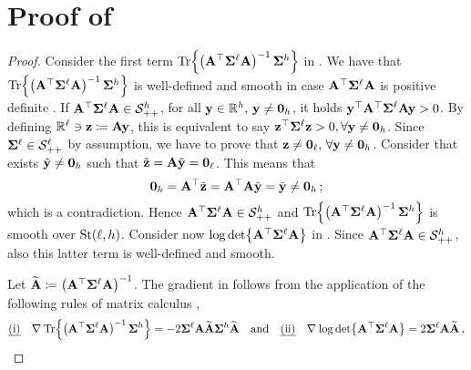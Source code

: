 \section{\texorpdfstring{Proof of }{Proof of Prop}}\label{app:proof}

\smoothnessth*
\begin{proof}
    Consider the first term $\Tr{\left(\A^\top \covlow \A \right)^{-1} \covhigh}$ in .
    We have that $\Tr{\left(\mathbf{A}^\top \covlow \mathbf{A} \right)^{-1} \covhigh}$ is well-defined and smooth in case $\mathbf{A}^\top \boldsymbol{\Sigma}^{\ell} \mathbf{A}$ is positive definite .
    If $\mathbf{A}^\top \boldsymbol{\Sigma}^{\ell} \mathbf{A} \in \mathcal{S}_{++}^h$, for all $\mathbf{y}\in \mathbb{R}^h, \, \mathbf{y}\neq \boldsymbol{0}_h$, it holds $\mathbf{y}^\top \mathbf{A}^\top \boldsymbol{\Sigma}^{\ell} \mathbf{A} \mathbf{y} > 0$.
    By defining $\mathbb{R}^\ell \ni \mathbf{z} \coloneqq \mathbf{A} \mathbf{y}$, this is equivalent to say $\mathbf{z}^\top \boldsymbol{\Sigma}^{\ell} \mathbf{z} > 0, \forall \mathbf{y} \neq \boldsymbol{0}_h$.
    Since $\boldsymbol{\Sigma}^{\ell} \in \mathcal{S}_{++}^{\ell}$ by assumption, we have to prove that $\mathbf{z} \neq \boldsymbol{0}_\ell, \, \forall \mathbf{y}\neq \boldsymbol{0}_h$.
    Consider that exists $\tilde{\mathbf{y}} \neq \boldsymbol{0}_h$ such that $\tilde{\mathbf{z}}=\mathbf{A}\tilde{\mathbf{y}}=\boldsymbol{0}_\ell$. 
    This means that 
    \begin{equation}
        \boldsymbol{0}_h = \mathbf{A}^\top \tilde{\mathbf{z}} = \mathbf{A}^\top \mathbf{A} \tilde{\mathbf{y}} = \tilde{\mathbf{y}} \neq \boldsymbol{0}_h\,;
    \end{equation}
    which is a contradiction.
    Hence $\mathbf{A}^\top \boldsymbol{\Sigma}^{\ell} \mathbf{A} \in \mathcal{S}_{++}^h$ and $\Tr{\left( \mathbf{A}^\top \covlow \mathbf{A}\right)^{-1} \covhigh}$ is smooth over $\mathrm{St}({\ell},{h})$.
    Consider now $\log\det{\mathbf{A}^\top \covlow \mathbf{A}}$ in . 
    Since $\mathbf{A}^\top \boldsymbol{\Sigma}^{\ell} \mathbf{A} \in \mathcal{S}_{++}^h$, also this latter term is well-defined and smooth.
    
    Let $\widetilde{\mathbf{A}}\coloneqq\left(\mathbf{A}^\top \boldsymbol{\Sigma}^{\ell} \mathbf{A}\right)^{-1}$. 
    The gradient in  follows from the application of the following rules of matrix calculus ,
    \begin{equation}\label{eq:rules_matrix_calculus}
        \text{\emph{(i)}}\quad \Egrad{}{\Tr{\left( \mathbf{A}^\top \covlow \mathbf{A}\right)^{-1} \covhigh}} = - 2 \covlow \mathbf{A} \widetilde{\mathbf{A}} \covhigh \widetilde{\mathbf{A}} \quad \text{and} \quad \text{\emph{(ii)}} \quad \Egrad{}{\log \det {\mathbf{A}^\top \covlow \mathbf{A}} = 2 \covlow \mathbf{A} \widetilde{\mathbf{A}}}\,,
    \end{equation}
\end{proof}